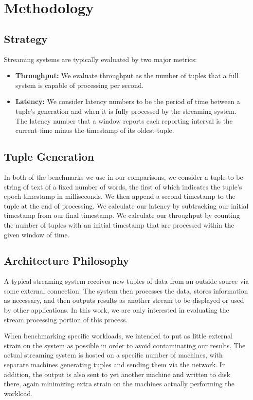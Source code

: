 \section{Methodology}

\subsection{Strategy}
\label{ssec:strategy}
Streaming systems are typically evaluated by two major metrics:
\begin{itemize}
\item \textbf{Throughput:} We evaluate throughput as the number of tuples that a full system is capable of processing per second.
\item \textbf{Latency:} We consider latency numbers to be the period of time between a tuple's generation and when it is fully processed by the streaming system.  The latency number that a window reports each reporting interval is the current time minus the timestamp of its oldest tuple.
\end{itemize}

\subsection{Tuple Generation}
\label{ssec:tuple-gen-meth}
In both of the benchmarks we use in our comparisons, we consider a tuple to be string of text of a fixed number of words, the first of which indicates the tuple's epoch timestamp in milliseconds.  We then append a second timestamp to the tuple at the end of processing.  We calculate our latency by subtracking our initial timestamp from our final timestamp.  We calculate our throughput by counting the number of tuples with an initial timestamp that are processed within the given window of time.

\subsection{Architecture Philosophy}
\label{ssec:arch-phil}
A typical streaming system receives new tuples of data from an outside source via some external connection.  The system then processes the data, stores information as necessary, and then outputs results as another stream to be displayed or used by other applications.  In this work, we are only interested in evaluating the stream processing portion of this process.

When benchmarking specific workloads, we intended to put as little external strain on the system as possible in order to avoid contaminating our results.  The actual streaming system is hosted on a specific number of machines, with separate machines generating tuples and sending them via the network.  In addition, the output is also sent to yet another machine and written to disk there, again minimizing extra strain on the machines actually performing the workload.

